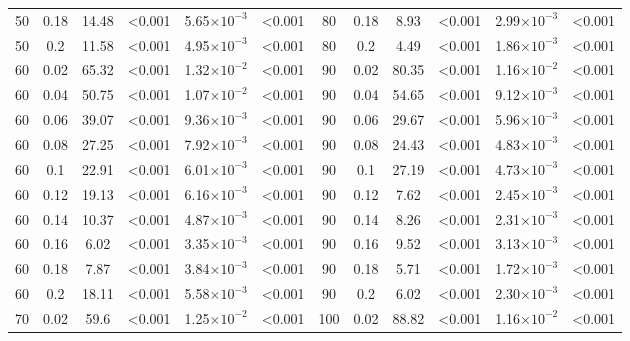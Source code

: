 \documentclass[12pt]{article}
\begin{document}
\begin{table}[hb!]
\begin{tabular}{c c | c c| c c ||c c | c c | c c |}
                50  & 0.18  & 14.48 & \textless0.001 & 5.65$\times10^{-3}$ & \textless0.001 & 80  & 0.18  & 8.93  & \textless0.001 & 2.99$\times10^{-3}$ & \textless0.001 \\
                50  & 0.2 & 11.58 & \textless0.001 & 4.95$\times10^{-3}$ & \textless0.001 & 80  & 0.2 & 4.49  & \textless0.001 & 1.86$\times10^{-3}$ & \textless0.001 \\
                60  & 0.02  & 65.32 & \textless0.001 & 1.32$\times10^{-2}$ & \textless0.001 & 90  & 0.02  & 80.35 & \textless0.001 & 1.16$\times10^{-2}$ & \textless0.001 \\
                60  & 0.04  & 50.75 & \textless0.001 & 1.07$\times10^{-2}$ & \textless0.001 & 90  & 0.04  & 54.65 & \textless0.001 & 9.12$\times10^{-3}$ & \textless0.001 \\
                60  & 0.06  & 39.07 & \textless0.001 & 9.36$\times10^{-3}$ & \textless0.001 & 90  & 0.06  & 29.67 & \textless0.001 & 5.96$\times10^{-3}$ & \textless0.001 \\
                60  & 0.08  & 27.25 & \textless0.001 & 7.92$\times10^{-3}$ & \textless0.001 & 90  & 0.08  & 24.43 & \textless0.001 & 4.83$\times10^{-3}$ & \textless0.001 \\
                60  & 0.1 & 22.91 & \textless0.001 & 6.01$\times10^{-3}$ & \textless0.001 & 90  & 0.1 & 27.19 & \textless0.001 & 4.73$\times10^{-3}$ & \textless0.001 \\
                60  & 0.12  & 19.13 & \textless0.001 & 6.16$\times10^{-3}$ & \textless0.001 & 90  & 0.12  & 7.62  & \textless0.001 & 2.45$\times10^{-3}$ & \textless0.001 \\
                60  & 0.14  & 10.37 & \textless0.001 & 4.87$\times10^{-3}$ & \textless0.001 & 90  & 0.14  & 8.26  & \textless0.001 & 2.31$\times10^{-3}$ & \textless0.001 \\
                60  & 0.16  & 6.02  & \textless0.001 & 3.35$\times10^{-3}$ & \textless0.001 & 90  & 0.16  & 9.52  & \textless0.001 & 3.13$\times10^{-3}$ & \textless0.001 \\
                60  & 0.18  & 7.87  & \textless0.001 & 3.84$\times10^{-3}$ & \textless0.001 & 90  & 0.18  & 5.71  & \textless0.001 & 1.72$\times10^{-3}$ & \textless0.001 \\
                60  & 0.2 & 18.11 & \textless0.001 & 5.58$\times10^{-3}$ & \textless0.001 & 90  & 0.2 & 6.02  & \textless0.001 & 2.30$\times10^{-3}$ & \textless0.001 \\
                70  & 0.02  & 59.6  & \textless0.001 & 1.25$\times10^{-2}$ & \textless0.001 & 100 & 0.02  & 88.82 & \textless0.001 & 1.16$\times10^{-2}$ & \textless0.001 \\

\end{tabular}
\end{table}
\end{document}
